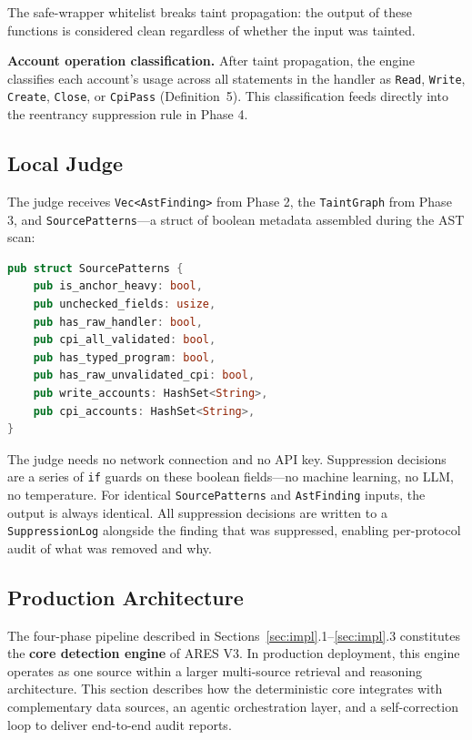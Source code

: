 \documentclass{article}
\begin{document}
The safe-wrapper whitelist breaks taint propagation: the output of these functions is considered clean regardless of whether the input was tainted.

\textbf{Account operation classification.} After taint propagation, the engine classifies each account's usage across all statements in the handler as \texttt{Read}, \texttt{Write}, \texttt{Create}, \texttt{Close}, or \texttt{CpiPass} (Definition~5). This classification feeds directly into the reentrancy suppression rule in Phase 4.

\subsection{Local Judge}

The judge receives \texttt{Vec<AstFinding>} from Phase 2, the \texttt{TaintGraph} from Phase 3, and \texttt{SourcePatterns}---a struct of boolean metadata assembled during the AST scan:
\vspace{-2pt}
\begin{lstlisting}[language=Rust]
pub struct SourcePatterns {
    pub is_anchor_heavy: bool,
    pub unchecked_fields: usize,
    pub has_raw_handler: bool,
    pub cpi_all_validated: bool,
    pub has_typed_program: bool,
    pub has_raw_unvalidated_cpi: bool,
    pub write_accounts: HashSet<String>,
    pub cpi_accounts: HashSet<String>,
}
\end{lstlisting}
\vspace{-2pt}
The judge needs no network connection and no API key. Suppression decisions are a series of \texttt{if} guards on these boolean fields---no machine learning, no LLM, no temperature. For identical \texttt{SourcePatterns} and \texttt{AstFinding} inputs, the output is always identical. All suppression decisions are written to a \texttt{SuppressionLog} alongside the finding that was suppressed, enabling per-protocol audit of what was removed and why.

\subsection{Production Architecture}
\label{sec:prod_arch}

The four-phase pipeline described in Sections~\ref{sec:impl}.1--\ref{sec:impl}.3 constitutes the \textbf{core detection engine} of ARES V3. In production deployment, this engine operates as one source within a larger multi-source retrieval and reasoning architecture. This section describes how the deterministic core integrates with complementary data sources, an agentic orchestration layer, and a self-correction loop to deliver end-to-end audit reports.
\end{document}
